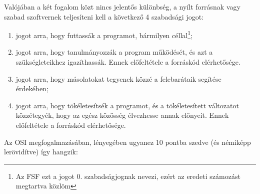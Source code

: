 \documentclass[12pt,magyar,a4paper,oneside]{scrreprt}
\providecommand{\tightlist}{%
  \setlength{\itemsep}{0pt}\setlength{\parskip}{0pt}}
\begin{document}
Valójában a két fogalom közt nincs jelentős különbség, a nyílt forrásnak
vagy szabad szoftvernek teljesíteni kell a következő 4 szabadsági jogot:

\begin{enumerate}
\def\labelenumi{\arabic{enumi}.}
\setcounter{enumi}{-1}
\tightlist
\item
  jogot arra, hogy futtassák a programot, bármilyen céllal\footnote{Az
    FSF ezt a jogot 0. szabadságjognak nevezi, ezért az eredeti
    számozást megtartva közlöm};
\item
  jogot arra, hogy tanulmányozzák a program működését, és azt a
  szükségleteikhez igazíthassák. Ennek előfeltétele a forráskód
  elérhetősége.
\item
  jogot arra, hogy másolatokat tegyenek közzé a felebarátaik segítése
  érdekében;
\item
  jogot arra, hogy tökéletesítsék a programot, és a tökéletesített
  változatot közzétegyék, hogy az egész közösség élvezhesse annak
  előnyeit. Ennek előfeltétele a forráskód elérhetősége.
\end{enumerate}

Az OSI megfogalmazásában, lényegében ugyanez 10 pontba szedve (és
némiképp lerövidítve) így hangzik:
\end{document}
